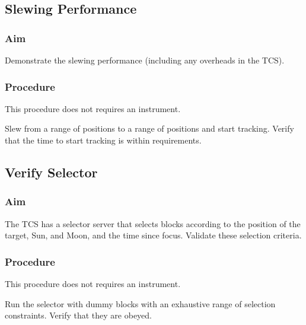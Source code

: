 \documentclass{article}
\begin{document}

\subsection{Slewing Performance}

\subsubsection{Aim}

Demonstrate the slewing performance (including any overheads in the TCS).

\subsubsection{Procedure}

This procedure does not requires an instrument.

Slew from a range of positions to a range of positions and start tracking. Verify that the time to start tracking is within requirements.


\subsection{Verify Selector}

\subsubsection{Aim}

The TCS has a selector server that selects blocks according to the position of the target, Sun, and Moon, and the time since focus. Validate these selection criteria.

\subsubsection{Procedure}

This procedure does not requires an instrument.

Run the selector with dummy blocks with an exhaustive range of selection constraints. Verify that they are obeyed.

\end{document}
